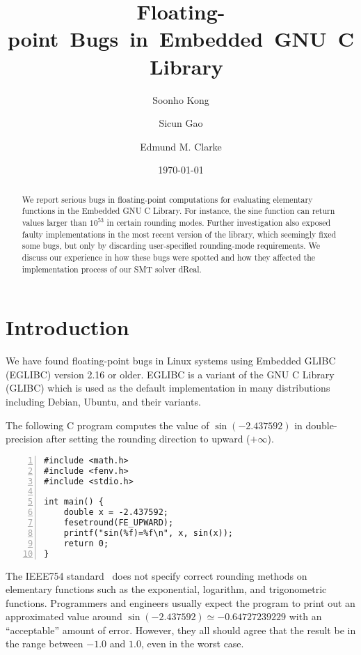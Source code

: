 \documentclass{llncs}
\title{\mbox{Floating-point Bugs in Embedded GNU C Library}}
\author{Soonho Kong \and Sicun Gao \and Edmund M. Clarke}
\institute{Carnegie Mellon University, Pittsburgh, PA 15213}
\date{\today}
\begin{document}
\maketitle

\begin{abstract}
We report serious bugs in floating-point computations for evaluating elementary
functions in the Embedded GNU C Library. For instance, the sine
function can return values larger than $10^{53}$ in certain rounding
modes. Further investigation also exposed faulty implementations in
the most recent version of the library, which seemingly fixed some
bugs, but only by discarding user-specified rounding-mode
requirements. We discuss our experience in how these bugs were
spotted and how they affected the implementation process of our
SMT solver dReal.
\end{abstract}

\section{Introduction}\label{sec:intro}




We have found floating-point bugs in Linux systems using Embedded
GLIBC (EGLIBC) version 2.16 or older. EGLIBC is a variant of the GNU C
Library (GLIBC) which is used as the default implementation in many
distributions including Debian, Ubuntu, and their variants.

The following C program computes the value of $\sin(-2.437592)$ in
double-precision after setting the rounding direction to upward
($+\infty$).

\begin{Verbatim}[numbers=left, frame=single, fontsize=\relsize{-1}]
#include <math.h>
#include <fenv.h>
#include <stdio.h>

int main() {
    double x = -2.437592;
    fesetround(FE_UPWARD);
    printf("sin(%f)=%f\n", x, sin(x));
    return 0;
}
\end{Verbatim}

The IEEE754 standard~\cite{IEEE:1985:AIS} does not specify correct
rounding methods on elementary functions such as the exponential,
logarithm, and trigonometric functions. Programmers and engineers
usually expect the program to print out an approximated value around
$\sin(-2.437592) \simeq -0.64727239229$ with an ``acceptable'' amount
of error. However, they all should agree that the result be in the
range between $-1.0$ and $1.0$, even in the worst case.
\end{document}
